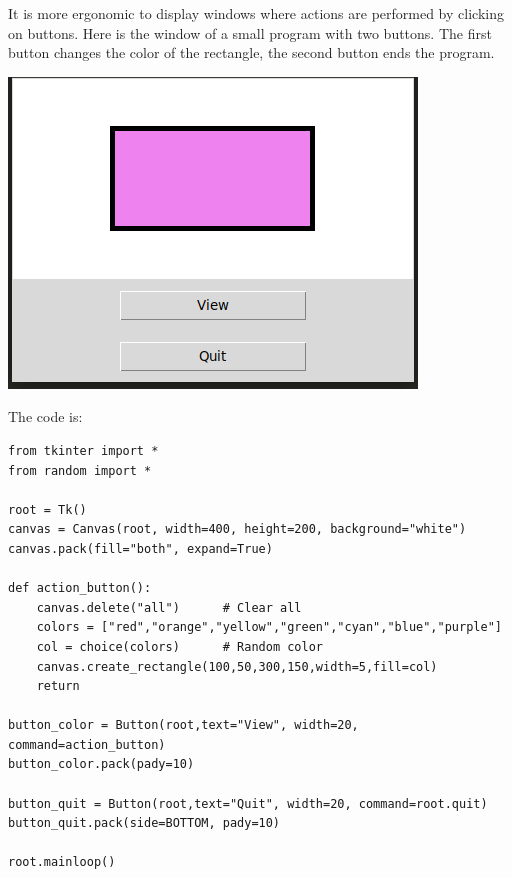 \documentclass[11pt,class=report,crop=false]{standalone}
\begin{document}
It is more ergonomic to display windows where actions are performed by clicking on buttons.
Here is the window of a small program with two buttons. The first button changes the color of the rectangle, the second button ends the program.
\begin{center}
\includegraphics[scale=\myscale,scale=0.6]{../statistics/screen-stat-lesson-buttons-en}
\end{center}

The code is:
\begin{lstlisting}
from tkinter import *
from random import *

root = Tk()     
canvas = Canvas(root, width=400, height=200, background="white")
canvas.pack(fill="both", expand=True)

def action_button():
    canvas.delete("all")      # Clear all
    colors = ["red","orange","yellow","green","cyan","blue","purple"]
    col = choice(colors)      # Random color
    canvas.create_rectangle(100,50,300,150,width=5,fill=col)
    return

button_color = Button(root,text="View", width=20, command=action_button)
button_color.pack(pady=10)

button_quit = Button(root,text="Quit", width=20, command=root.quit)
button_quit.pack(side=BOTTOM, pady=10)

root.mainloop()
\end{lstlisting}
\end{document}
